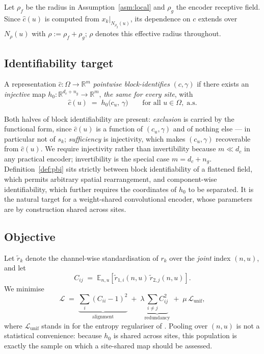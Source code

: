 Let $\rho_f$ be the radius in Assumption~\ref{asm:local} and $\rho_g$ the encoder receptive
field. Since $\hat c(u)$ is computed from $x_k|_{N_{\rho_g}(u)}$, its dependence on $c$ extends
over $N_\rho(u)$ with $\rho := \rho_f + \rho_g$; $\rho$ denotes this effective radius
throughout.

\subsection{Identifiability target}
\label{sec:target}

\begin{definition}
\label{def:pbi}
A representation $\hat c : \Omega \to \mathbb{R}^m$ \emph{pointwise block-identifies}
$(c,\gamma)$ if there exists an \emph{injective} map
$h_0 : \mathbb{R}^{d_c + n_g} \to \mathbb{R}^{m}$, \emph{the same for every site}, with
\begin{equation}
  \hat c(u) \;=\; h_0\big(c_u,\, \gamma\big)
  \qquad \text{for all } u \in \Omega, \; \text{a.s.}
\end{equation}
\end{definition}

Both halves of block identifiability are present: \emph{exclusion} is carried by the functional
form, since $\hat c(u)$ is a function of $(c_u,\gamma)$ and of nothing else --- in particular
not of $s_k$; \emph{sufficiency} is injectivity, which makes $(c_u,\gamma)$ recoverable from
$\hat c(u)$. We require injectivity rather than invertibility because $m \ll d_c$ in any
practical encoder; invertibility is the special case $m = d_c + n_g$. Definition~\ref{def:pbi}
sits strictly between block identifiability of a flattened field, which permits arbitrary
spatial rearrangement, and component-wise identifiability, which further requires the
coordinates of $h_0$ to be separated. It is the natural target for a weight-shared
convolutional encoder, whose parameters are by construction shared across sites.

\subsection{Objective}
\label{sec:obj}

Let $\tilde r_k$ denote the channel-wise standardisation of $r_k$ over the \emph{joint} index
$(n,u)$, and let
\begin{equation}
  C_{ij} \;=\; \mathbb{E}_{n,u}\!\left[\tilde r_{1,i}(n,u)\, \tilde r_{2,j}(n,u)\right].
\end{equation}
We minimise
\begin{equation}
  \mathcal{L} \;=\; \underbrace{\textstyle\sum_i (C_{ii}-1)^2}_{\text{alignment}}
   \;+\; \lambda \underbrace{\textstyle\sum_{i\neq j} C_{ij}^2}_{\text{redundancy}}
   \;+\; \mu\, \mathcal{L}_{\mathrm{unif}},
  \label{eq:obj}
\end{equation}
where $\mathcal{L}_{\mathrm{unif}}$ stands in for the entropy regulariser of
\citet{yao2024}. Pooling over $(n,u)$ is not a statistical convenience: because $h_0$ is shared
across sites, this population is exactly the sample on which a site-shared map should be
assessed.

